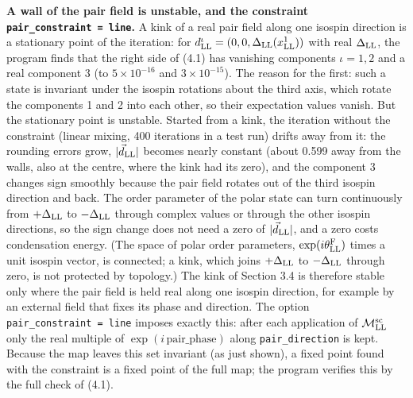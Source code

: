 \documentclass[
  10pt,
]{article}
\begin{document}
\textbf{A wall of the pair field is unstable, and the constraint
\texttt{pair\_constraint\ =\ line}.} A kink of a real pair field along
one isospin direction is a stationary point of the iteration: for
\(d^\iota_{\rm LL}=(0,0,\Delta_{\rm LL}(x^1_{\rm LL}))\) with real
\(\Delta_{\rm LL}\), the program finds that the right side of (4.1) has
vanishing components \(\iota=1,2\) and a real component 3 (to
\(5\times10^{-16}\) and \(3\times10^{-15}\)). The reason for the first:
such a state is invariant under the isospin rotations about the third
axis, which rotate the components 1 and 2 into each other, so their
expectation values vanish. But the stationary point is unstable. Started
from a kink, the iteration without the constraint (linear mixing, 400
iterations in a test run) drifts away from it: the rounding errors grow,
\(\lvert\vec d_{\rm LL}\rvert\) becomes nearly constant (about 0.599
away from the walls, also at the centre, where the kink had its zero),
and the component 3 changes sign smoothly because the pair field rotates
out of the third isospin direction and back. The order parameter of the
polar state can turn continuously from \(+\Delta_{\rm LL}\) to
\(-\Delta_{\rm LL}\) through complex values or through the other isospin
directions, so the sign change does not need a zero of
\(\lvert\vec d_{\rm LL}\rvert\), and a zero costs condensation energy.
(The space of polar order parameters, \(\exp(i\theta^{\rm F}_{\rm LL})\)
times a unit isospin vector, is connected; a kink, which joins
\(+\Delta_{\rm LL}\) to \(-\Delta_{\rm LL}\) through zero, is not
protected by topology.) The kink of Section 3.4 is therefore stable only
where the pair field is held real along one isospin direction, for
example by an external field that fixes its phase and direction. The
option \texttt{pair\_constraint\ =\ line} imposes exactly this: after
each application of \(\mathcal M^{\rm sc}_{\rm LL}\) only the real
multiple of \(\exp(i\,\text{pair\_phase})\) along
\texttt{pair\_direction} is kept. Because the map leaves this set
invariant (as just shown), a fixed point found with the constraint is a
fixed point of the full map; the program verifies this by the full check
of (4.1).
\end{document}
